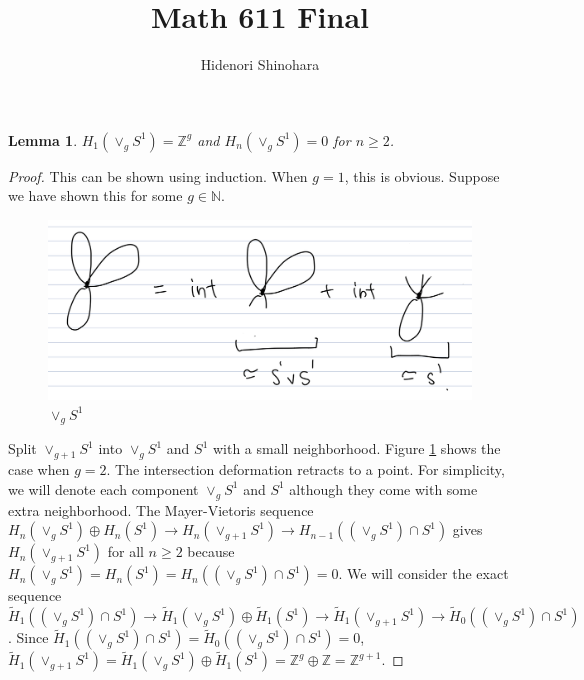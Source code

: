 \documentclass[12pt, psamsfonts]{amsart}
\newtheorem{lem}[thm]{Lemma}
\theoremstyle{definition}
\theoremstyle{remark}
\numberwithin{equation}{section}
\begin{document}
\title{Math 611 Final}
\author{Hidenori Shinohara}
\maketitle

\begin{lem}\label{lemma:g}
  $H_1(\vee_g S^1) = \mathbb{Z}^g$ and $H_n(\vee_g S^1) = 0$ for $n \geq 2$.
\end{lem}

\begin{proof}
  This can be shown using induction.
  When $g = 1$, this is obvious.
  Suppose we have shown this for some $g \in \mathbb{N}$.
  \begin{figure}[!htb]
    \includegraphics[width=.5\linewidth]{lemmasg.jpeg}
    \caption{$\vee_g S^1$}
    \label{fig:lemsg}
  \end{figure}
  Split $\vee_{g + 1} S^1$ into $\vee_g S^1$ and $S^1$ with a small neighborhood.
  Figure \ref{fig:lemsg} shows the case when $g = 2$.
  The intersection deformation retracts to a point.
  For simplicity, we will denote each component $\vee_g S^1$ and $S^1$ although they come with some extra neighborhood.
  The Mayer-Vietoris sequence $H_n(\vee_g S^1) \oplus H_n(S^1) \rightarrow H_n(\vee_{g + 1} S^1) \rightarrow H_{n - 1}((\vee_g S^1) \cap S^1)$ gives $H_n(\vee_{g + 1}S^1)$ for all $n \geq 2$ because $H_n(\vee_g S^1) = H_n(S^1) = H_n((\vee_g S^1) \cap S^1) = 0$.
  We will consider the exact sequence $\tilde{H}_1((\vee_g S^1) \cap S^1) \rightarrow \tilde{H}_1(\vee_g S^1) \oplus \tilde{H}_1(S^1) \rightarrow \tilde{H}_1(\vee_{g + 1} S^1) \rightarrow \tilde{H}_0((\vee_g S^1) \cap S^1)$.
  Since $\tilde{H}_1((\vee_g S^1) \cap S^1) = \tilde{H}_0((\vee_g S^1) \cap S^1) = 0$, 
  $\tilde{H}_1(\vee_{g + 1} S^1) = \tilde{H}_1(\vee_g S^1) \oplus \tilde{H}_1(S^1) = \mathbb{Z}^g \oplus \mathbb{Z} = \mathbb{Z}^{g + 1}$.
\end{proof}
\end{document}
